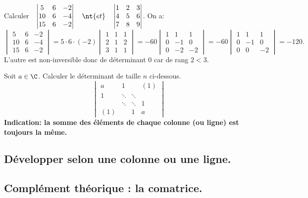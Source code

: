 \documentclass[11pt]{article}
\begin{document}
\begin{ex}{}{}
    Calculer$\quad \begin{vmatrix}
        5 & 6 & -2 \\
        10 & 6 & -4 \\
        15 & 6 & -2
    \end{vmatrix}
    \quad \nt{et} \quad
    \begin{vmatrix}
        1 & 2 & 3 \\
        4 & 5 & 6 \\
        7 & 8 & 9
    \end{vmatrix}$.
    \tcblower
    On a:
    \begin{equation*}
        \begin{vmatrix}
            5 & 6 & -2 \\
            10 & 6 & -4 \\
            15 & 6 & -2
        \end{vmatrix}
        =5\cdot6\cdot(-2)\begin{vmatrix}
            1&1&1\\
            2&1&2\\
            3&1&1
        \end{vmatrix}
        =-60\begin{vmatrix}
            1&1&1\\
            0&-1&0\\
            0&-2&-2
        \end{vmatrix}
        =-60\begin{vmatrix}
            1&1&1\\
            0&-1&0\\
            0&0&-2
        \end{vmatrix}=-120.
    \end{equation*}
    L'autre est non-inversible donc de déterminant 0 car de rang $2<3$. 
\end{ex}

\begin{ex}{}{}
    Soit $a\in\C$. Calculer le déterminant de taille $n$ ci-dessous.
    \begin{equation*}
        \begin{vmatrix}
            a&1&&(1)\\
            1&\ddots&\ddots&\\
            &\ddots&\ddots&1\\
            (1)&&1&a
        \end{vmatrix}
    \end{equation*}
    \bf{Indication:} la somme des éléments de chaque colonne (ou ligne) est toujours la même.
    \tcblower

\end{ex}

\subsection{Développer selon une colonne ou une ligne.}
\subsection{Complément théorique : la comatrice.}
\end{document}
